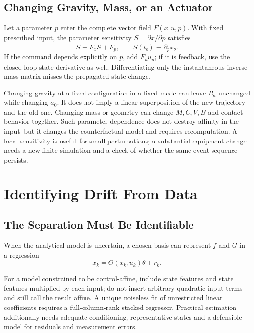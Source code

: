 \subsection{Changing Gravity, Mass, or an Actuator}
Let a parameter $p$ enter the complete vector field $F(x,u,p)$. With fixed prescribed input, the parameter sensitivity $S=\partial x/\partial p$ satisfies
\begin{equation}
\dot S=F_xS+F_p,\qquad S(t_b)=\partial_p x_b.
\label{eq:ch7:parameter-sensitivity}
\end{equation}
\label{eq:ch7:gravity-counterfactual}
\label{eq:ch7:mass-redistribution}
If the command depends explicitly on $p$, add $F_u u_p$; if it is feedback, use the closed-loop state derivative as well. Differentiating only the instantaneous inverse mass matrix misses the propagated state change.

Changing gravity at a fixed configuration in a fixed mode can leave $B_a$ unchanged while changing $a_0$. It does not imply a linear superposition of the new trajectory and the old one. Changing mass or geometry can change $M,C,V,B$ and contact behavior together. Such parameter dependence does not destroy affinity in the input, but it changes the counterfactual model and requires recomputation. A local sensitivity is useful for small perturbations; a substantial equipment change needs a new finite simulation and a check of whether the same event sequence persists.

\section{Identifying Drift From Data}
\label{sec:ch7:data-driven}

\subsection{The Separation Must Be Identifiable}
When the analytical model is uncertain, a chosen basis can represent $f$ and $G$ in a regression
\begin{equation}
\dot x_k=\Theta(x_k,u_k)\theta+r_k.
\label{eq:ch7:regression}
\end{equation}

For a model constrained to be control-affine, include state features and state features multiplied by each input; do not insert arbitrary quadratic input terms and still call the result affine. A unique noiseless fit of unrestricted linear coefficients requires a full-column-rank stacked regressor. Practical estimation additionally needs adequate conditioning, representative states and a defensible model for residuals and measurement errors.

